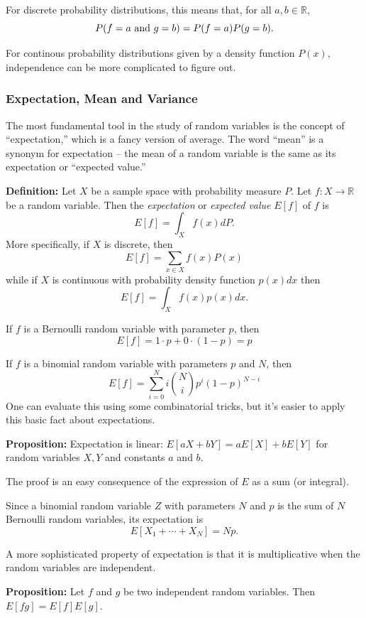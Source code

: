\documentclass[
]{article}
\begin{document}
For discrete probability distributions, this means that, for all
\(a,b\in\mathbb{R}\), \[
P(f=a\hbox{\rm\ and\ }g=b)=P(f=a)P(g=b).
\]

For continous probability distributions given by a density function
\(P(x)\), independence can be more complicated to figure out.

\hypertarget{expectation-mean-and-variance}{%
\subsubsection{Expectation, Mean and
Variance}\label{expectation-mean-and-variance}}

The most fundamental tool in the study of random variables is the
concept of ``expectation,'' which is a fancy version of average. The
word ``mean'' is a synonym for expectation -- the mean of a random
variable is the same as its expectation or ``expected value.''

\textbf{Definition:} Let \(X\) be a sample space with probability
measure \(P\). Let \(f:X\to \mathbb{R}\) be a random variable. Then the
\emph{expectation} or \emph{expected value} \(E[f]\) of \(f\) is \[
E[f] = \int_X f(x)dP.
\] More specifically, if \(X\) is discrete, then \[
E[f] = \sum_{x\in X} f(x)P(x)
\] while if \(X\) is continuous with probability density function
\(p(x)dx\) then \[
E[f] = \int_{X} f(x)p(x)dx.
\]

If \(f\) is a Bernoulli random variable with parameter \(p\), then \[
E[f] = 1\cdot p+0\cdot (1-p) = p
\]

If \(f\) is a binomial random variable with parameters \(p\) and \(N\),
then \[
E[f] = \sum_{i=0}^{N} i\binom{N}{i}p^{i}(1-p)^{N-i}
\] One can evaluate this using some combinatorial tricks, but it's
easier to apply this basic fact about expectations.

\textbf{Proposition:} Expectation is linear: \(E[aX+bY]=aE[X]+bE[Y]\)
for random variables \(X,Y\) and constants \(a\) and \(b\).

The proof is an easy consequence of the expression of \(E\) as a sum (or
integral).

Since a binomial random variable \(Z\) with parameters \(N\) and \(p\)
is the sum of \(N\) Bernoulli random variables, its expectation is \[
E[X_1+\cdots+X_N]=Np.
\]

A more sophisticated property of expectation is that it is
multiplicative when the random variables are independent.

\textbf{Proposition:} Let \(f\) and \(g\) be two independent random
variables. Then \(E[fg]=E[f]E[g]\).
\end{document}

